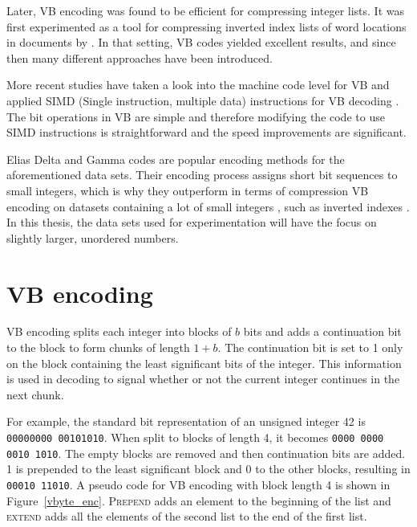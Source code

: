 Later, VB encoding was found to be efficient for compressing integer lists. It was first experimented as a tool for compressing inverted index lists of word locations in documents by \citep{Sch02}. 
In that setting, VB codes yielded excellent results, and since then many different approaches have been introduced. 

More recent studies have taken a look into the machine code level for VB and applied SIMD (Single instruction, multiple data) instructions for VB decoding \citep{Lem18,Pla15}. The bit 
operations in VB are simple and therefore modifying the code to use SIMD instructions is straightforward and the speed improvements are significant. 

Elias Delta and Gamma codes \citep{Eli75} are popular encoding methods for the aforementioned data sets. Their encoding process assigns short bit sequences to small integers, 
which is why they outperform in terms of compression VB encoding on datasets containing a lot of small integers \citep{Wil99}, such as inverted indexes \citep{Anh05, Pib19}. In this thesis, 
the data sets used for experimentation will have the focus on slightly larger, unordered numbers.

\section{VB encoding}
VB encoding splits each integer into blocks of $b$ bits and adds a continuation bit to the block to form chunks of length $1+b$. The continuation bit is set to 1 only
on the block containing the least significant bits of the integer. This information is used in decoding to signal whether or not the current integer continues in the next chunk. 

For example, the standard bit representation of an unsigned integer 42 is \texttt{00000000 00101010}. When split to blocks of length 4, it becomes \texttt{0000 0000 0010 1010}. The empty blocks 
are removed and then continuation bits are added. 1 is prepended to the least significant block and 0 to the other blocks, resulting in \texttt{00010 11010}. A pseudo code for VB encoding with 
block length 4 is shown in Figure~\ref{vbyte_enc}. \textsc{Prepend} adds an element to the beginning of the list 
and \textsc{extend} adds all the elements of the second list to the end of the first list.

